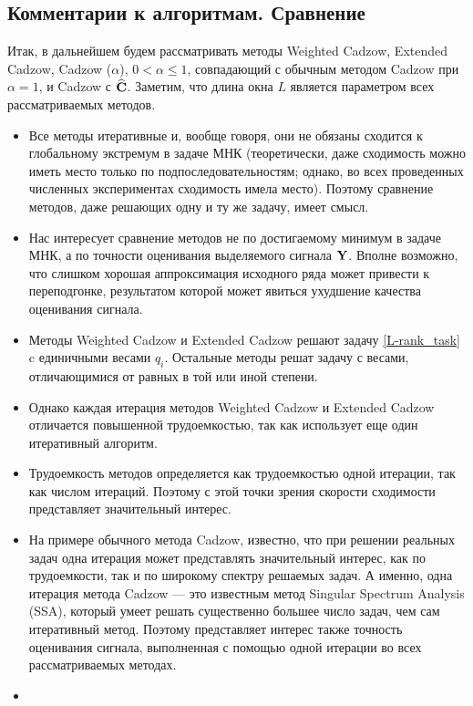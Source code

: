 \documentclass[12pt,a4paper,fleqn,leqno]{article}
\begin{document}
\subsection{Комментарии к алгоритмам. Сравнение}

Итак, в дальнейшем будем рассматривать методы
Weighted Cadzow, Extended Cadzow, Cadzow ($\alpha$), $0< \alpha \leq 1$, совпадающий с обычным методом Cadzow при $\alpha=1$,
и Cadzow с $\widehat {\mathbf{C}}$.
Заметим, что длина окна $L$ является параметром всех рассматриваемых методов.

\begin{itemize}
\item
Все методы итеративные и, вообще говоря, они не обязаны сходится к глобальному экстремум в задаче МНК  (теоретически, даже сходимость можно иметь место только по подпоследовательностям; однако, во всех проведенных численных экспериментах сходимость имела место). Поэтому сравнение методов, даже
решающих одну и ту же задачу, имеет смысл.
\item
Нас интересует сравнение методов не по достигаемому минимум в задаче МНК, а по точности оценивания выделяемого сигнала $\mathbf{Y}$.
Вполне возможно, что слишком хорошая аппроксимация исходного ряда может привести к переподгонке, результатом которой
может явиться ухудшение качества оценивания сигнала.
\item
Методы Weighted Cadzow и Extended Cadzow решают задачу \eqref{L-rank_task} c единичными весами $q_i$. Остальные методы решат задачу с весами, отличающимися от равных в той или иной степени.
\item
Однако каждая итерация методов Weighted Cadzow и Extended Cadzow отличается повышенной трудоемкостью, так как использует
еще один итеративный алгоритм.
\item
Трудоемкость методов определяется как трудоемкостью одной итерации, так как числом итераций. Поэтому с этой точки зрения скорости сходимости представляет значительный интерес.
\item
На примере обычного метода Cadzow, известно, что при решении реальных задач одна итерация может представлять значительный интерес, как по трудоемкости, так и по широкому спектру решаемых задач. А именно, одна итерация метода Cadzow --- это известным метод Singular Spectrum Analysis (SSA), который умеет решать существенно большее число задач, чем сам итеративный метод. Поэтому представляет интерес также точность оценивания сигнала, выполненная с помощью одной итерации во всех рассматриваемых методах.
\item

\end{itemize}
\end{document}
